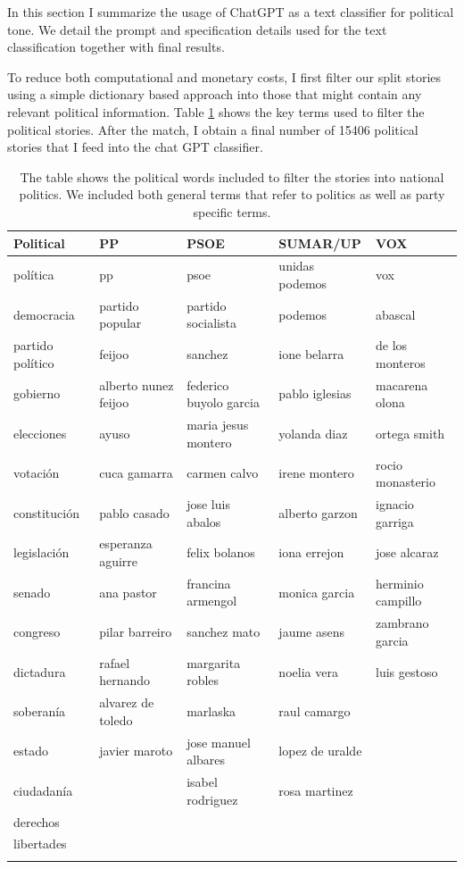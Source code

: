 \documentclass[12pt]{article}
\begin{document}
	In this section I summarize the usage of ChatGPT as a text classifier for political tone. We detail the prompt and specification details used for the text classification together with final results. 
	
	
	
	
	To reduce both computational and monetary costs, I first filter our split stories using a simple dictionary based approach into those that might contain any relevant political information. Table \ref{table:politics} shows the key terms used to filter the political stories. After the match, I obtain a final number of 15406 political stories that I feed into the chat GPT classifier.
	
	\begin{longtable}{|l|l|l|l|l|}
		\hline
		\textbf{Political} & \textbf{PP} & \textbf{PSOE} & \textbf{SUMAR/UP} & \textbf{VOX} \\
		\hline
		política & pp & psoe & unidas podemos & vox \\
		democracia & partido popular & partido socialista & podemos & abascal \\
		partido político & feijoo & sanchez & ione belarra &de los monteros \\
		gobierno & alberto nunez feijoo & federico buyolo garcia & pablo iglesias & macarena olona \\
		elecciones & ayuso & maria jesus montero & yolanda diaz & ortega smith \\
		votación & cuca gamarra & carmen calvo & irene montero & rocio monasterio \\
		constitución & pablo casado & jose luis abalos & alberto garzon & ignacio garriga \\
		legislación & esperanza aguirre & felix bolanos & iona errejon &jose alcaraz \\
		senado & ana pastor & francina armengol & monica garcia & herminio campillo \\
		congreso & pilar barreiro & sanchez mato & jaume asens & zambrano garcia \\
		dictadura & rafael hernando & margarita robles & noelia vera & luis gestoso \\
		soberanía &alvarez de toledo & marlaska & raul camargo & \\
		estado & javier maroto & jose manuel albares &lopez de uralde & \\
		ciudadanía &  & isabel rodriguez & rosa martinez & \\
		derechos &  &  &  & \\
		libertades &  &  &  & \\
		\hline
		\caption{The table shows the political words included to filter the stories into national politics. We included both general terms that refer to politics as well as party specific terms.}
		\label{table:politics}
	\end{longtable}
	
\end{document}
